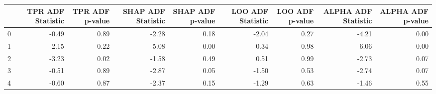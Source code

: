 \begin{tabular}{lrrrrrrrr}
\toprule
 & TPR ADF Statistic & TPR ADF p-value & SHAP ADF Statistic & SHAP ADF p-value & LOO ADF Statistic & LOO ADF p-value & ALPHA ADF Statistic & ALPHA ADF p-value \\
\midrule
0 & -0.49 & 0.89 & -2.28 & 0.18 & -2.04 & 0.27 & -4.21 & 0.00 \\
1 & -2.15 & 0.22 & -5.08 & 0.00 & 0.34 & 0.98 & -6.06 & 0.00 \\
2 & -3.23 & 0.02 & -1.58 & 0.49 & 0.51 & 0.99 & -2.73 & 0.07 \\
3 & -0.51 & 0.89 & -2.87 & 0.05 & -1.50 & 0.53 & -2.74 & 0.07 \\
4 & -0.60 & 0.87 & -2.37 & 0.15 & -1.29 & 0.63 & -1.46 & 0.55 \\
\bottomrule
\end{tabular}
